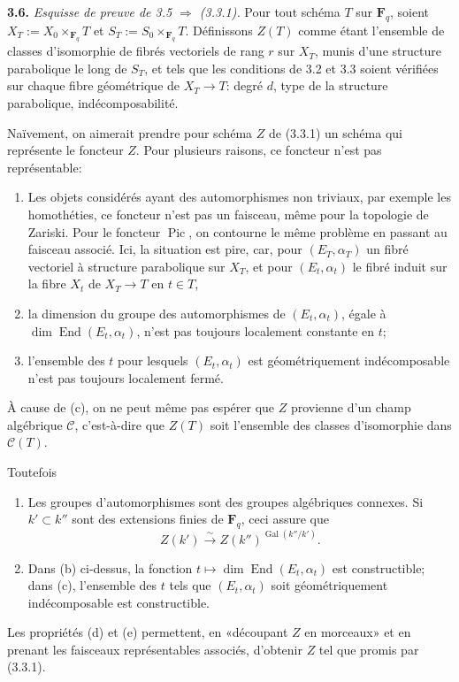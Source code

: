 \documentclass[11pt]{article}
\newcommand{\Fq}{\mathbf{F}_q}
\newcommand{\Gal}{\operatorname{Gal}}
\newcommand{\Pic}{\operatorname{Pic}}
\newcommand{\End}{\operatorname{End}}
\newcommand{\para}[1]{\medskip\noindent\textbf{#1}\enspace}
\begin{document}
\para{3.6.} \textit{Esquisse de preuve de 3.5 \(\Rightarrow\) (3.3.1).} Pour tout schéma \(T\) sur \(\Fq\), soient \(X_T:=X_0\times_{\Fq}T\) et \(S_T:=S_0\times_{\Fq}T\). Définissons \(Z(T)\) comme étant l'ensemble de classes d'isomorphie de fibrés vectoriels de rang \(r\) sur \(X_T\), munis d'une structure parabolique le long de \(S_T\), et tels que les conditions de 3.2 et 3.3 soient vérifiées sur chaque fibre géométrique de \(X_T\to T\): degré \(d\), type de la structure parabolique, indécomposabilité.

Naïvement, on aimerait prendre pour schéma \(Z\) de (3.3.1) un schéma qui représente le foncteur \(Z\). Pour plusieurs raisons, ce foncteur n'est pas représentable:
\begin{enumerate}[label=(\alph*),leftmargin=2.5em]
\item Les objets considérés ayant des automorphismes non triviaux, par exemple les homothéties, ce foncteur n'est pas un faisceau, même pour la topologie de Zariski. Pour le foncteur \(\Pic\), on contourne le même problème en passant au faisceau associé. Ici, la situation est pire, car, pour \((E_T,\alpha_T)\) un fibré vectoriel à structure parabolique sur \(X_T\), et pour \((E_t,\alpha_t)\) le fibré induit sur la fibre \(X_t\) de \(X_T\to T\) en \(t\in T\),
\item la dimension du groupe des automorphismes de \((E_t,\alpha_t)\), égale à \(\dim\End(E_t,\alpha_t)\), n'est pas toujours localement constante en \(t\);
\item l'ensemble des \(t\) pour lesquels \((E_t,\alpha_t)\) est géométriquement indécomposable n'est pas toujours localement fermé.
\end{enumerate}
À cause de (c), on ne peut même pas espérer que \(Z\) provienne d'un champ algébrique \(\mathcal C\), c'est-à-dire que \(Z(T)\) soit l'ensemble des classes d'isomorphie dans \(\mathcal C(T)\).

Toutefois
\begin{enumerate}[label=(\alph*),leftmargin=2.5em,start=4]
\item Les groupes d'automorphismes sont des groupes algébriques connexes. Si \(k'\subset k''\) sont des extensions finies de \(\Fq\), ceci assure que
\[
  Z(k')\xrightarrow{\sim} Z(k'')^{\Gal(k''/k')} .
\]
\item Dans (b) ci-dessus, la fonction \(t\mapsto\dim\End(E_t,\alpha_t)\) est constructible; dans (c), l'ensemble des \(t\) tels que \((E_t,\alpha_t)\) soit géométriquement indécomposable est constructible.
\end{enumerate}
Les propriétés (d) et (e) permettent, en «découpant \(Z\) en morceaux» et en prenant les faisceaux représentables associés, d'obtenir \(Z\) tel que promis par (3.3.1).
\end{document}
